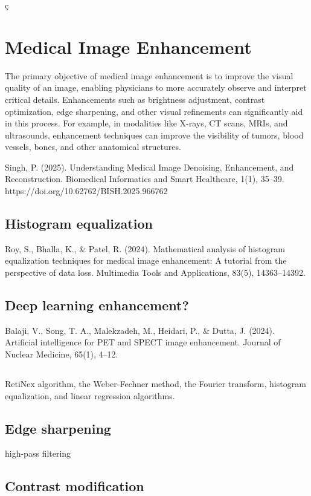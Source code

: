 ç\chapter{Medical Image Enhancement}

The primary objective of medical image enhancement is to improve the visual quality of an image, enabling physicians to more accurately observe and interpret critical details. Enhancements such as brightness adjustment, contrast optimization, edge sharpening, and other visual refinements can significantly aid in this process. For example, in modalities like X-rays, CT scans, MRIs, and ultrasounds, enhancement techniques can improve the visibility of tumors, blood vessels, bones, and other anatomical structures.

Singh, P. (2025). Understanding Medical Image Denoising, Enhancement, and Reconstruction. Biomedical Informatics and Smart Healthcare, 1(1), 35–39. https://doi.org/10.62762/BISH.2025.966762

\section{Histogram equalization}

Roy, S., Bhalla, K., & Patel, R. (2024). Mathematical analysis of histogram equalization techniques for medical image enhancement: A tutorial from the perspective of data loss. Multimedia Tools and Applications, 83(5), 14363–14392.

\section{Deep learning enhancement?}

Balaji, V., Song, T. A., Malekzadeh, M., Heidari, P., & Dutta, J. (2024). Artificial intelligence for PET and SPECT image enhancement. Journal of Nuclear Medicine, 65(1), 4–12.

\section{}
RetiNex algorithm, the Weber-Fechner method, the Fourier transform, histogram equalization, and linear regression algorithms.

\section{Edge sharpening}

high-pass filtering \cite{bushberg2011essential}

\section{Contrast modification}